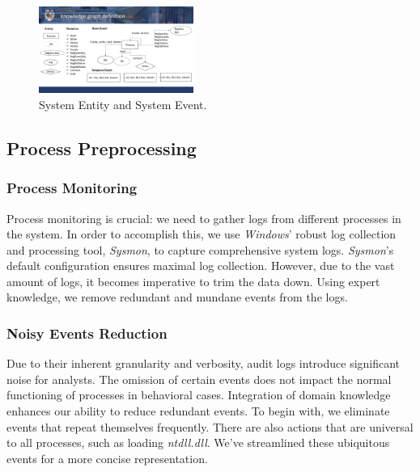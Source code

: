 \begin{figure}[ht]
    \centering
      \includegraphics[width=0.45\textwidth]{figs/entity.pdf}
    \caption{System Entity and System Event.}
    \label{fig-entity}
\end{figure}

\subsection{Process Preprocessing}

\subsubsection{Process Monitoring}

Process monitoring is crucial: we need to gather logs from different processes in the system. In order to accomplish this, we use \textit{Windows}' robust log collection and processing tool, \textit{Sysmon}, to capture comprehensive system logs. \textit{Sysmon}'s default configuration ensures maximal log collection. 
However, due to the vast amount of logs, it becomes imperative to trim the data down. Using expert knowledge, we remove redundant and mundane events from the logs.

\subsubsection{Noisy Events Reduction}
Due to their inherent granularity and verbosity, audit logs introduce significant noise for analysts.
The omission of certain events does not impact the normal functioning of processes in behavioral cases. Integration of domain knowledge enhances our ability to reduce redundant events. 
To begin with, we eliminate events that repeat themselves frequently.
There are also actions that are universal to all processes, such as loading \textit{ntdll.dll}. We've streamlined these ubiquitous events for a more concise representation.

